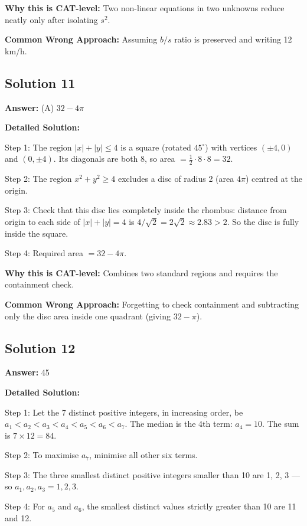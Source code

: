 \documentclass[11pt]{article}
\begin{document}
\textbf{Why this is CAT-level:} Two non-linear equations in two unknowns reduce neatly only after isolating \(s^{2}\).

\textbf{Common Wrong Approach:} Assuming \(b/s\) ratio is preserved and writing 12 km/h.

\subsection*{Solution 11}
\textbf{Answer:} (A) \(32 - 4\pi\)

\textbf{Detailed Solution:}

Step 1: The region \(|x|+|y| \le 4\) is a square (rotated \(45^\circ\)) with vertices \((\pm 4, 0)\) and \((0, \pm 4)\). Its diagonals are both 8, so area \(= \tfrac{1}{2}\cdot 8 \cdot 8 = 32\).

Step 2: The region \(x^{2}+y^{2} \ge 4\) excludes a disc of radius 2 (area \(4\pi\)) centred at the origin.

Step 3: Check that this disc lies completely inside the rhombus: distance from origin to each side of \(|x|+|y|=4\) is \(4/\sqrt{2} = 2\sqrt{2} \approx 2.83 > 2\). So the disc is fully inside the square.

Step 4: Required area \(= 32 - 4\pi\).

\textbf{Why this is CAT-level:} Combines two standard regions and requires the containment check.

\textbf{Common Wrong Approach:} Forgetting to check containment and subtracting only the disc area inside one quadrant (giving \(32 - \pi\)).

\subsection*{Solution 12}
\textbf{Answer:} 45

\textbf{Detailed Solution:}

Step 1: Let the 7 distinct positive integers, in increasing order, be \(a_1 < a_2 < a_3 < a_4 < a_5 < a_6 < a_7\). The median is the 4th term: \(a_4 = 10\). The sum is \(7 \times 12 = 84\).

Step 2: To maximise \(a_7\), minimise all other six terms.

Step 3: The three smallest distinct positive integers smaller than 10 are 1, 2, 3 — so \(a_1, a_2, a_3 = 1, 2, 3\).

Step 4: For \(a_5\) and \(a_6\), the smallest distinct values strictly greater than 10 are 11 and 12.
\end{document}
